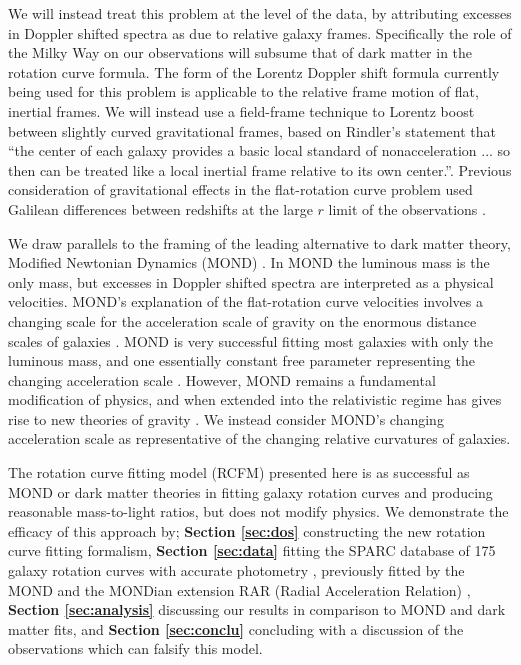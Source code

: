 \documentclass[reprint,%
 amsmath,amssymb,
 aps,
]{revtex4-1}
\begin{document}
    We will instead treat this problem at the level of the data,   by attributing excesses in Doppler shifted spectra as due to  relative galaxy frames.   Specifically the role of the Milky Way on our observations will subsume that of dark matter in the rotation curve formula.
  The form of the   Lorentz Doppler shift formula currently being used for this problem is applicable to  the relative frame motion of flat, inertial  frames. 
We will instead use a field-frame technique to  Lorentz boost between slightly curved gravitational frames, based on 
 Rindler's statement that        ``the center of each galaxy provides a basic local standard of nonacceleration ... so then can be treated like a local inertial frame relative to its own center.''\cite{rindler2013essential}. Previous consideration of gravitational effects in the flat-rotation curve problem used Galilean differences between redshifts at the large $r$ limit of the observations \cite{MTW}.
 

   
 We draw parallels to the framing of the 
 leading   alternative     to dark matter theory,  Modified Newtonian Dynamics (MOND) \cite{Milgrom}. 
 In MOND    the   luminous mass is the only mass,  
 but excesses in  Doppler shifted spectra are  interpreted as   a physical   velocities. 
 MOND's explanation of the    flat-rotation curve velocities involves a changing scale for the   acceleration scale of gravity   on the enormous distance scales of galaxies  \cite{McGaugh_2014}. 
MOND  is very successful  fitting most galaxies with only the luminous mass, and one   essentially   constant free parameter representing the changing acceleration scale \cite{2016Lelli}. 
However,  MOND  remains a   fundamental  modification of  physics, and    when extended  into the relativistic regime  has gives rise to  new theories of gravity  \cite{PhysRevD.70.083509,doi:10.1142/S0217751X0703666X,Famaey2012}. 
We instead consider MOND's changing acceleration scale  as representative of  the
changing relative curvatures of galaxies. 

The rotation curve fitting model (RCFM)  presented here   is as  successful as   MOND or dark matter theories in fitting galaxy rotation curves and producing reasonable mass-to-light ratios, but does not modify physics.   We demonstrate     the efficacy of this  approach by; {\bf Section \ref{sec:dos}} constructing  the new rotation curve  fitting formalism, {\bf Section \ref{sec:data}}   
       fitting   the SPARC  database of 175  galaxy rotation curves with accurate photometry \cite{2016Lelli},  previously   fitted by the MOND  and the MONDian extension    RAR (Radial Acceleration Relation) \cite{McGaugh2016RAR,2016Lelli,McGaugh_2014,Li_2018},  
      {\bf Section \ref{sec:analysis}}   discussing our results in comparison to MOND and dark matter fits, 
 and  {\bf Section \ref{sec:conclu}}  concluding with a discussion of the observations which can falsify this model.  
 
\end{document}
